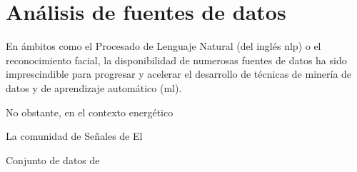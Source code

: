 \section{Análisis de fuentes de datos}
\label{sec:sustdata}

En ámbitos como el Procesado de Lenguaje Natural (del inglés \gls{nlp}) o el reconocimiento facial, la disponibilidad de numerosas fuentes de datos ha sido imprescindible para progresar y acelerar el desarrollo de técnicas de minería de datos y de aprendizaje automático (\gls{ml}).

\vspace{3mm}

No obstante, en el contexto energético 


La comunidad de %
Señales de %
El %

Conjunto de datos de %


